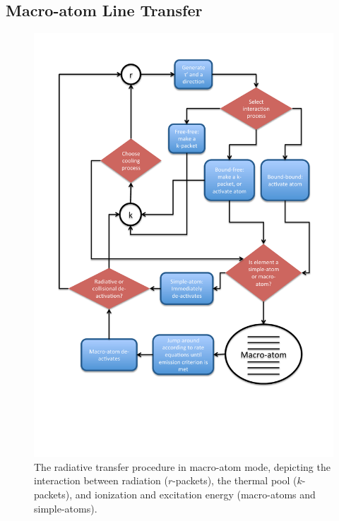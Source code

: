 \subsection{Macro-atom Line Transfer}

\begin{figure}
\centering
\includegraphics[width=1.0\textwidth, clip=true, trim=0 1.5in 0in 0in ]{figures/03-radtrans/flow_matom3.pdf}
\caption
{
The radiative transfer procedure in macro-atom mode, depicting the interaction
between radiation ($r$-packets), the thermal pool ($k$-packets), and ionization
and excitation energy (macro-atoms and simple-atoms).
} 
\label{fig:flowchart}
\end{figure}


